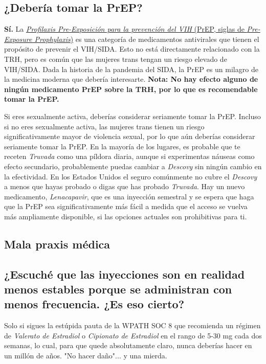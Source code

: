 \documentclass{article}
\begin{document}
\subsection{¿Debería tomar la PrEP?}\label{11-25}

\textbf{Sí.} La \href{https://en.wikipedia.org/wiki/Pre-exposure_prophylaxis_for_HIV_prevention}{\textit{Profilaxis Pre-Exposición para la prevención del VIH} (PrEP, siglas de \textit{Pre-Exposure Prophylaxis})} es una categoría de medicamentos antivirales que tienen el propósito de prevenir el VIH/SIDA. Esto no está directamente relacionado con la TRH, pero es común que las mujeres trans tengan un riesgo elevado de VIH/SIDA. Dada la historia de la pandemia del SIDA, la PrEP es un milagro de la medicina moderna que debería interesarte. \textbf{Nota: No hay efecto alguno de ningún medicamento PrEP sobre la TRH, por lo que es recomendable tomar la PrEP.}

Si eres sexualmente activa, deberías considerar seriamente tomar la PrEP. Incluso si no eres sexualmente activa, las mujeres trans tienen un riesgo significativamente mayor de violencia sexual, por lo que aún deberías considerar seriamente tomar la PrEP. En la mayoría de los lugares, es probable que te receten \textit{Truvada} como una píldora diaria, aunque si experimentas náuseas como efecto secundario, probablemente puedas cambiar a \textit{Descovy} sin ningún cambio en la efectividad. En los Estados Unidos el seguro comúnmente no cubre el \textit{Descovy} a menos que hayas probado o digas que has probado \textit{Truvada}. Hay un nuevo medicamento, \textit{Lenacapavir}, que es una inyección semestral y se espera que haga que la PrEP sea significativamente más fácil a medida que el acceso se vuelva más ampliamente disponible, si las opciones actuales son prohibitivas para ti.

\subsection*{Mala praxis médica}

\subsection{¿Escuché que las inyecciones son en realidad menos estables porque se administran con menos frecuencia. ¿Es eso cierto?}

Solo si sigues la estúpida pauta de la WPATH SOC 8 que recomienda un régimen de \textit{Valerato de Estradiol} o \textit{Cipionato de Estradiol} en el rango de 5-30 mg cada dos semanas, lo cual, para que quede absolutamente claro, nunca deberías hacer en un millón de años. "No hacer daño"... y una mierda.
\end{document}
